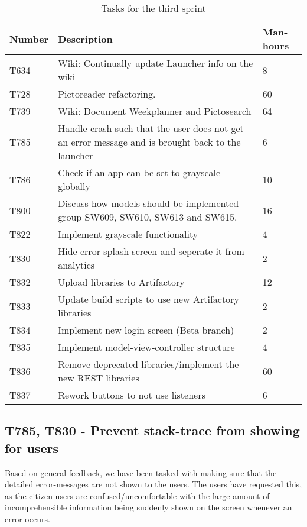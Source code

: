 \begin{table}[H]
\begin{centering}
\begin{tabular}{|l|p{9cm}|l|}
\hline
Number 	& Description & Man-hours \\ \hline
T634   	& Wiki: Continually update Launcher info on the wiki & 8\\\hline
T728  	& Pictoreader refactoring. & 60 \\ \hline
T739	& Wiki: Document Weekplanner and Pictosearch & 64\\ \hline
T785	& Handle crash such that the user does not get an error message and is
		  brought back to the launcher & 6\\ \hline
T786 	& Check if an app can be set to grayscale globally & 10\\ \hline
T800 	& Discuss how models should be implemented group SW609, SW610, SW613 and
		  SW615. & 16\\ \hline
T822 	& Implement grayscale functionality & 4\\ \hline
T830 	& Hide error splash screen and seperate it from analytics & 2\\ \hline
T832 	& Upload libraries to Artifactory & 12\\ \hline
T833 	& Update build scripts to use new Artifactory libraries & 2\\ \hline
T834 	& Implement new login screen (Beta branch) & 2\\ \hline
T835 	& Implement model-view-controller structure & 4\\ \hline
T836 	& Remove deprecated libraries/implement the new REST libraries & 60\\
\hline T837 	& Rework buttons to not use listeners & 6\\ \hline
\end{tabular}
\caption{Tasks for the third sprint}
\label{Tasks3}
\end{centering}
\end{table}

\subsection{T785, T830 - Prevent stack-trace from showing for users}
Based on general feedback, we have been tasked with making sure that the
detailed error-messages are not shown to the users. The users have requested
this, as the citizen users are confused/uncomfortable with the large amount of
incomprehensible information being suddenly shown on the screen whenever an
error occurs.\nl

